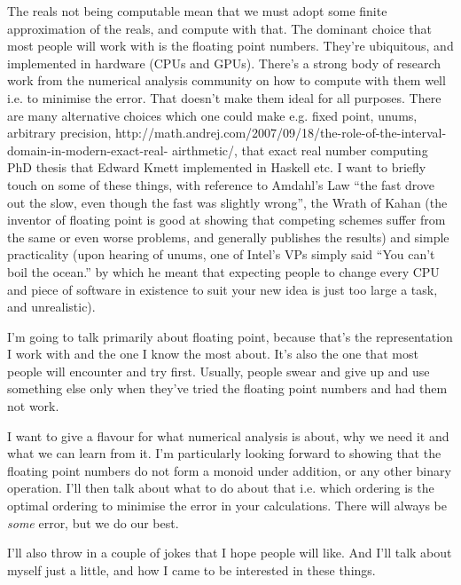 \documentclass{beamer}
\begin{document}
\begin{frame}
The reals not being computable mean that we must adopt some finite approximation of the reals, and compute
with that. The dominant choice that most people will work with is the floating point numbers. They're
ubiquitous, and implemented in hardware (CPUs and GPUs). There's a strong body of research work from the
numerical analysis community on how to compute with them well i.e. to minimise the error. That doesn't make
them ideal for all purposes. There are many alternative choices which one could make e.g. fixed point, unums,
arbitrary precision, http://math.andrej.com/2007/09/18/the-role-of-the-interval-domain-in-modern-exact-real-
airthmetic/, that exact real number computing PhD thesis that Edward Kmett implemented in Haskell etc. I want
to briefly touch on some of these things, with reference to Amdahl's Law ``the fast drove out the slow, even
though the fast was slightly wrong'', the Wrath of Kahan (the inventor of floating point is good at showing
that competing schemes suffer from the same or even worse problems, and generally publishes the results) and
simple practicality (upon hearing of unums, one of Intel's VPs simply said ``You can't boil the ocean.'' by
which he meant that expecting people to change every CPU and piece of software in existence to suit your new
idea is just too large a task, and unrealistic).

I'm going to talk primarily about floating point, because that's the representation I work with and the one I
know the most about. It's also the one that most people will encounter and try first. Usually, people swear
and give up and use something else only when they've tried the floating point numbers and had them not work.

I want to give a flavour for what numerical analysis is about, why we need it and what we can learn from it.
I'm particularly looking forward to showing that the floating point numbers do not form a monoid under
addition, or any other binary operation. I'll then talk about what to do about that i.e. which ordering is
the optimal ordering to minimise the error in your calculations. There will always be \emph{some} error, but
we do our best.

I'll also throw in a couple of jokes that I hope people will like. And I'll talk about myself just a little,
and how I came to be interested in these things.

\end{frame}
\end{document}
